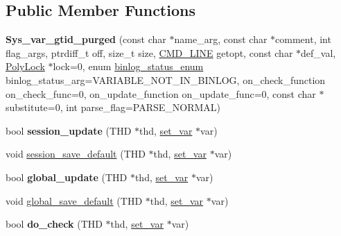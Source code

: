 \subsection*{Public Member Functions}
\begin{DoxyCompactItemize}
\item 
\mbox{\label{classSys__var__gtid__purged_a94bf84d9bd8068768f6f70f9da20a652}} 
{\bfseries Sys\+\_\+var\+\_\+gtid\+\_\+purged} (const char $\ast$name\+\_\+arg, const char $\ast$comment, int flag\+\_\+args, ptrdiff\+\_\+t off, size\+\_\+t size, \mbox{\hyperlink{structCMD__LINE}{C\+M\+D\+\_\+\+L\+I\+NE}} getopt, const char $\ast$def\+\_\+val, \mbox{\hyperlink{classPolyLock}{Poly\+Lock}} $\ast$lock=0, enum \mbox{\hyperlink{classsys__var_a664520ec82191888717c86085bfa83ce}{binlog\+\_\+status\+\_\+enum}} binlog\+\_\+status\+\_\+arg=V\+A\+R\+I\+A\+B\+L\+E\+\_\+\+N\+O\+T\+\_\+\+I\+N\+\_\+\+B\+I\+N\+L\+OG, on\+\_\+check\+\_\+function on\+\_\+check\+\_\+func=0, on\+\_\+update\+\_\+function on\+\_\+update\+\_\+func=0, const char $\ast$substitute=0, int parse\+\_\+flag=P\+A\+R\+S\+E\+\_\+\+N\+O\+R\+M\+AL)
\item 
\mbox{\label{classSys__var__gtid__purged_aebce8971cbfb56731e86845f792f866b}} 
bool {\bfseries session\+\_\+update} (T\+HD $\ast$thd, \mbox{\hyperlink{classset__var}{set\+\_\+var}} $\ast$var)
\item 
void \mbox{\hyperlink{classSys__var__gtid__purged_a899e9b452040b2f08438a6bbaef35644}{session\+\_\+save\+\_\+default}} (T\+HD $\ast$thd, \mbox{\hyperlink{classset__var}{set\+\_\+var}} $\ast$var)
\item 
\mbox{\label{classSys__var__gtid__purged_aadcb2e8497a6a3ba4ded94ef0d6ad36f}} 
bool {\bfseries global\+\_\+update} (T\+HD $\ast$thd, \mbox{\hyperlink{classset__var}{set\+\_\+var}} $\ast$var)
\item 
void \mbox{\hyperlink{classSys__var__gtid__purged_a7520649b0e520db8ab51b1e1e0c94b9e}{global\+\_\+save\+\_\+default}} (T\+HD $\ast$thd, \mbox{\hyperlink{classset__var}{set\+\_\+var}} $\ast$var)
\item 
\mbox{\label{classSys__var__gtid__purged_a6465184c7eafb901cf1cf1faaba23db7}} 
bool {\bfseries do\+\_\+check} (T\+HD $\ast$thd, \mbox{\hyperlink{classset__var}{set\+\_\+var}} $\ast$var)

\end{DoxyCompactItemize}
